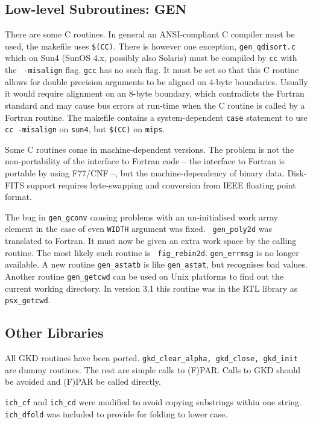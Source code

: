 \subsection{Low-level Subroutines: GEN}

There are some C routines. In general an ANSI-compliant
C compiler must be used, the makefile uses {\tt \$(CC)}. There is
however one exception, {\tt gen\_qdisort.c} which on Sun4 (SunOS 4.x,
possibly also Solaris) must be compiled by {\tt cc} with the {\tt
-misalign} flag. {\tt gcc} has no such flag. It must be set so that this
C routine allows for double precision arguments to be aligned on 4-byte
boundaries. Usually it would require alignment on an 8-byte boundary,
which contradicts the Fortran standard and may cause bus errors at
run-time when the C routine is called by a Fortran routine. The makefile
contains a system-dependent {\tt case} statement to use {\tt cc
-misalign} on {\tt sun4}, but {\tt \$(CC)} on {\tt mips}.

Some C routines come in machine-dependent versions.  The problem
is not the non-portability of the interface to Fortran code -- the
interface to Fortran is portable by using F77/CNF --, but the
machine-dependency of binary data.  Disk-FITS support requires
byte-swapping and conversion from IEEE floating point format.

The bug in {\tt gen\_gconv} causing problems with an un-initialised work
array element in the case of even {\tt WIDTH} argument was fixed.  {\tt
gen\_poly2d} was translated to Fortran.  It must now be given an extra
work space by the calling routine.  The most likely such routine is {\tt
fig\_rebin2d}.  {\tt gen\_errmsg} is no longer available.  A new routine
{\tt gen\_astatb} is like {\tt gen\_astat}, but recognises bad values.
Another routine {\tt gen\_getcwd} can be used on Unix platforms to find
out the current working directory.  In version 3.1 this routine was in
the RTL library as {\tt psx\_getcwd}.


\subsection{Other Libraries}

All GKD routines have been ported. {\tt gkd\-\_clear\-\_alpha, gkd\_close,
gkd\_init} are dummy routines. The rest are simple calls to (F)PAR.
Calls to GKD should be avoided and (F)PAR be called directly.

{\tt ich\_cf} and {\tt ich\_cd} were modified to avoid copying
substrings within one string. {\tt ich\_dfold} was included to provide
for folding to lower case.

